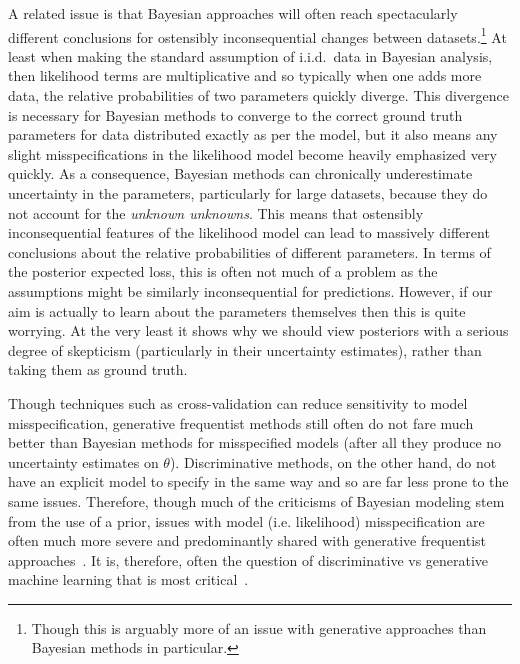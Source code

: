 A related issue is that Bayesian approaches will often reach
spectacularly different conclusions for ostensibly inconsequential changes between datasets.\footnote{Though this is arguably more
of an issue with generative approaches than Bayesian methods in particular.}
At least when making the standard assumption of i.i.d.~data in Bayesian analysis, then likelihood terms are multiplicative 
and so typically when one adds more data, the relative probabilities of two parameters quickly diverge.  This divergence is
necessary for Bayesian methods to converge to the correct ground truth parameters for data distributed exactly as per the
model, but it also means any slight misspecifications in the likelihood model
become heavily emphasized very quickly.  As a consequence, Bayesian methods can chronically underestimate uncertainty 
in the parameters, particularly for large datasets, because they do not account for
the \emph{unknown unknowns}.  This means that ostensibly  inconsequential features of the likelihood model
can lead to massively different conclusions about the relative probabilities of different parameters.
In terms of the posterior expected loss, this is often not much of a problem as the assumptions might be similarly
inconsequential for predictions.  However, if our aim is actually to learn 
about the parameters themselves then this is quite worrying.  At the very least it shows why we should view posteriors with
a serious degree of skepticism (particularly in their uncertainty estimates), rather than taking them as ground truth.

Though techniques such as cross-validation can reduce sensitivity to model
misspecification, generative frequentist methods still often do not fare much better than Bayesian
methods for misspecified models (after all they produce no uncertainty estimates on $\theta$).
Discriminative methods, on the other hand, do not have
an explicit model to specify in the same way and so are far less prone to the same issues.
Therefore, though  much of the criticisms of Bayesian modeling stem
from the use of a prior, issues with model (i.e. likelihood) misspecification are often much more severe and predominantly
shared with generative frequentist approaches~\citep{gelman2013not}.  It is, therefore, often the question of discriminative
vs generative machine learning that is most critical~\citep{breiman2001statistical}.

